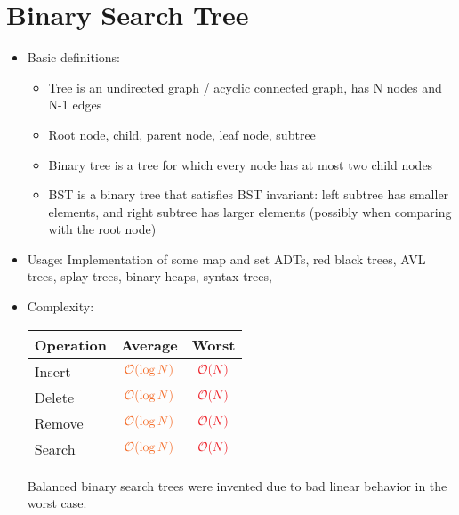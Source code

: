 \section{Binary Search Tree}
\begin{itemize}
	\item Basic definitions:
	\begin{itemize}
		\item Tree is an undirected graph / acyclic connected graph, has N nodes and N-1 edges
		\item Root node, child, parent node, leaf node, subtree
		\item Binary tree is a tree for which every node has at most two child nodes
		\item \ac{BST} is a binary tree that satisfies \ac{BST} invariant: left subtree has smaller elements, and right subtree has larger elements (possibly when comparing with the root node)
	\end{itemize}
	\item Usage: Implementation of some map and set \ac{ADT}s, red black trees, AVL trees, splay trees, binary heaps, syntax trees, \etc
	\item Complexity:
	\begin{center}
		\begin{tabular}{|l|c|c|}
			\hline
			Operation & Average & Worst \\ \hline
			Insert & $ \color{Orange} \mathcal{O}(\log N) $ & $ \color{Red} \mathcal{O}(N) $\\ \hline
			Delete & $ \color{Orange} \mathcal{O}(\log N) $ & $ \color{Red} \mathcal{O}(N) $\\ \hline
			Remove & $ \color{Orange} \mathcal{O}(\log N) $ & $ \color{Red} \mathcal{O}(N) $\\ \hline
			Search & $ \color{Orange} \mathcal{O}(\log N) $ & $ \color{Red} \mathcal{O}(N) $\\ \hline
		\end{tabular}
	\end{center}
	Balanced binary search trees were invented due to bad linear behavior in the worst case.
\end{itemize}

